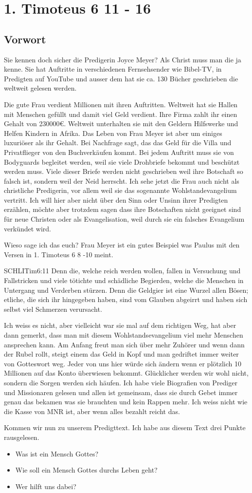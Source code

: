 \documentclass[12pt]{../../inc/mybib}
\author{Lothar Schmid}
\begin{document}
\section{1. Timoteus 6 11 - 16}

\subsection{Vorwort}
Sie kennen doch sicher die Predigerin Joyce Meyer? Als Christ muss man die ja kenne. Sie hat Auftritte in verschiedenen Fernsehsender wie Bibel-TV, in Predigten auf YouTube und ausser dem hat sie ca. 130 Bücher geschrieben die weltweit gelesen werden.

Die gute Frau verdient Millionen mit ihren Auftritten. Weltweit hat sie Hallen mit Menschen gefüllt und damit viel Geld verdient. Ihre Firma zahlt ihr einen Gehalt von 230000€. Weltweit unterhalten sie mit den Geldern Hilfswerke und Helfen Kindern in Afrika. Das Leben von Frau Meyer ist aber um einiges luxuriöser als ihr Gehalt. Bei Nachfrage sagt, das das Geld für die Villa und Privatflieger von den Buchverkäufen kommt. Bei jedem Auftritt muss sie von Bodyguards begleitet werden, weil sie viele Drohbriefe bekommt und beschützt werden muss. Viele dieser Briefe werden nicht geschrieben weil ihre Botschaft so falsch ist, sondern weil der Neid herrscht. Ich sehe jetzt die Frau auch nicht als christliche Predigerin, vor allem weil sie das sogenannte Wohlstandevangelium vertritt. Ich will hier aber nicht über den Sinn oder Unsinn ihrer Predigten erzählen, möchte aber trotzdem sagen dass ihre Botschaften nicht geeignet sind für neue Christen oder als Evangelisation, weil durch sie ein falsches Evangelium verkündet wird.

Wieso sage ich das euch? Frau Meyer ist ein gutes Beispiel was Paulus mit den Versen in 1. Timoteus 6 8 -10 meint.
\begin{bibelbox}{SCHL}{ITim}{6:11}
Denn die, welche reich werden wollen, fallen in Versuchung und Fallstricken und viele tötichte und schädliche Begierden, welche die Menschen in Untergang und Verderben stürzen. Denn die Geldgier ist eine Wurzel allen Bösen; etliche, die sich ihr hingegeben haben, sind vom Glauben abgeirrt und haben sich selbst viel Schmerzen verursacht.
\end{bibelbox}
Ich weiss es nicht, aber vielleicht war sie mal auf dem richtigen Weg, hat aber dann gemerkt, dass man mit diesem Wohlstandsevangelium viel mehr Menschen ansprechen kann. Am Anfang freut man sich über mehr Zuhörer und wenn dann der Rubel rollt, steigt einem das Geld in Kopf und man gedriftet immer weiter von Gotteswort weg. Jeder von uns hier würde sich ändern wenn er plötzlich 10 Millionen auf das Konto überwiesen bekommt. Glücklicher werden wir wohl nicht, sondern die Sorgen werden sich häufen. Ich habe viele Biografien von Prediger und Missionaren gelesen und allen ist gemeinsam, dass sie durch Gebet immer genau das bekamen was sie brauchten und kein Rappen mehr. Ich weiss nicht wie die Kasse von MNR ist, aber wenn alles bezahlt reicht das.

Kommen wir nun zu unserem Predigttext. Ich habe aus diesem Text drei Punkte rausgelesen.
\begin{itemize}
    \item Was ist ein Mensch Gottes?
    \item Wie soll ein Mensch Gottes durchs Leben geht?
    \item Wer hilft uns dabei?
\end{itemize}
\end{document}
